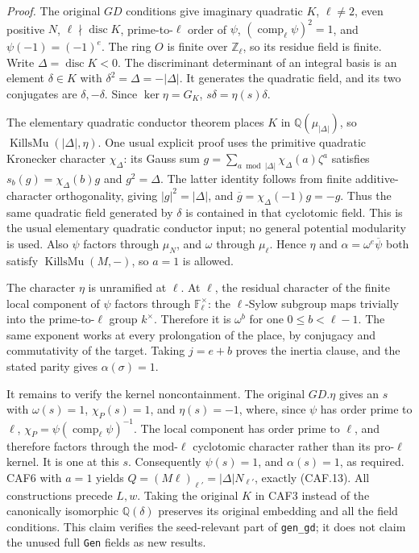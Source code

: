 \documentclass[11pt,a4paper]{article}
\numberwithin{equation}{section}
\theoremstyle{remark}\newtheorem{remark}[theorem]{Remark}
\begin{document}
\emph{Proof.}
The original \(GD\) conditions give imaginary quadratic \(K\),
\(\ell\ne2\), even positive \(N\),
\(\ell\nmid\operatorname{disc}K\), prime-to-\(\ell\) order of
\(\psi\), \((\operatorname{comp}_\ell\psi)^2=1\), and
\(\psi(-1)=(-1)^e\).  The ring \(O\) is finite over
\(\mathbb Z_\ell\), so its residue field is finite.
Write \(\Delta=\operatorname{disc}K<0\).  The discriminant
determinant of an integral basis is an element \(\delta\in K\)
with \(\delta^2=\Delta=-|\Delta|\).  It generates the quadratic
field, and its two conjugates are \(\delta,-\delta\).  Since
\(\ker\eta=G_K\), \(s\delta=\eta(s)\delta\).

The elementary quadratic conductor theorem places
\(K\) in \(\mathbb Q(\mu_{|\Delta|})\), so
\(\operatorname{KillsMu}(|\Delta|,\eta)\).  One usual explicit
proof uses the primitive quadratic Kronecker character \(\chi_\Delta\):
its Gauss sum \(g=\sum_{a\bmod |\Delta|}\chi_\Delta(a)\zeta^a\)
satisfies \(s_b(g)=\chi_\Delta(b)g\) and \(g^2=\Delta\).
The latter identity follows from finite additive-character
orthogonality, giving \(|g|^2=|\Delta|\), and
\(\overline g=\chi_\Delta(-1)g=-g\).
Thus the same quadratic field generated by \(\delta\) is contained
in that cyclotomic field.  This is the usual elementary quadratic
conductor input; no general potential modularity is used.
Also \(\psi\) factors through \(\mu_N\), and \(\omega\) through
\(\mu_\ell\).  Hence \(\eta\) and
\(\alpha=\omega^e\overline\psi\) both satisfy
\(\operatorname{KillsMu}(M,-)\), so \(a=1\) is allowed.

The character \(\eta\) is unramified at \(\ell\).
At \(\ell\), the residual character of the finite local component
of \(\psi\) factors through \(\mathbb F_\ell^\times\): the
\(\ell\)-Sylow subgroup maps trivially into the prime-to-\(\ell\)
group \(k^\times\).  Therefore it is \(\omega^b\) for one
\(0\le b<\ell-1\).  The same exponent works at every prolongation
of the place, by conjugacy and commutativity of the target.  Taking
\(j=e+b\) proves the inertia clause, and the stated parity gives
\(\alpha(\sigma)=1\).

It remains to verify the kernel noncontainment.  The original
\(GD.\eta\) gives an \(s\) with \(\omega(s)=1\),
\(\chi_P(s)=1\), and \(\eta(s)=-1\), where, since \(\psi\)
has order prime to \(\ell\),
\(\chi_P=\psi(\operatorname{comp}_\ell\psi)^{-1}\).
The local component has order prime to \(\ell\), and therefore
factors through the mod-\(\ell\) cyclotomic character rather than
its pro-\(\ell\) kernel.  It is one at this \(s\).
Consequently \(\psi(s)=1\), and \(\alpha(s)=1\), as required.
CAF6 with \(a=1\) yields
\(Q=(M\ell)_{\ell'}=|\Delta|N_{\ell'}\), exactly (CAF.13).
All constructions precede \(L,w\).  Taking the original \(K\)
in CAF3 instead of the canonically isomorphic \(\mathbb Q(\delta)\)
preserves its original embedding and all the field conditions.
This claim verifies the seed-relevant part of \texttt{gen\_\allowbreak gd}; it
does not claim the unused full \texttt{Gen} fields as new results.
\end{document}
